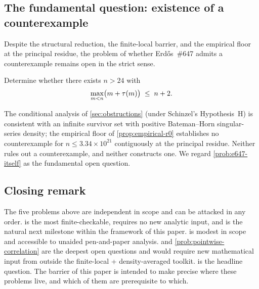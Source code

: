 \subsection{The fundamental question: existence of a counterexample}
\label{sec:open-existence}

Despite the structural reduction, the finite-local barrier, and the
empirical floor at the principal residue, the problem of whether
Erd\H{o}s~\#647 admits a counterexample remains open in the strict
sense.

\begin{problem}
\label{prob:e647-itself}
Determine whether there exists $n > 24$ with
\[
\max_{m < n} \bigl( m + \tau(m) \bigr) \;\le\; n + 2 .
\]
\end{problem}

The conditional analysis of \cref{sec:obstructions} (under
Schinzel's Hypothesis~H) is consistent with an infinite survivor
set with positive Bateman--Horn singular-series density; the
empirical floor of \cref{prop:empirical-r0} establishes no
counterexample for $n \le 3.34 \times 10^{21}$ contiguously at the
principal residue. Neither rules out a counterexample, and neither
constructs one. We regard \cref{prob:e647-itself} as the
fundamental open question.

\subsection{Closing remark}
\label{sec:open-closing}

The five problems above are independent in scope and can be
attacked in any order.  is the most
finite-checkable, requires no new analytic input, and is the
natural next milestone within the framework of this paper.
 is modest in scope and accessible to
unaided pen-and-paper analysis.  and
\cref{prob:pointwise-correlation} are the deepest open questions
and would require new mathematical input from outside the
finite-local + density-averaged toolkit. 
is the headline question. The barrier of this paper is intended to
make precise where these problems live, and which of them are
prerequisite to which.

